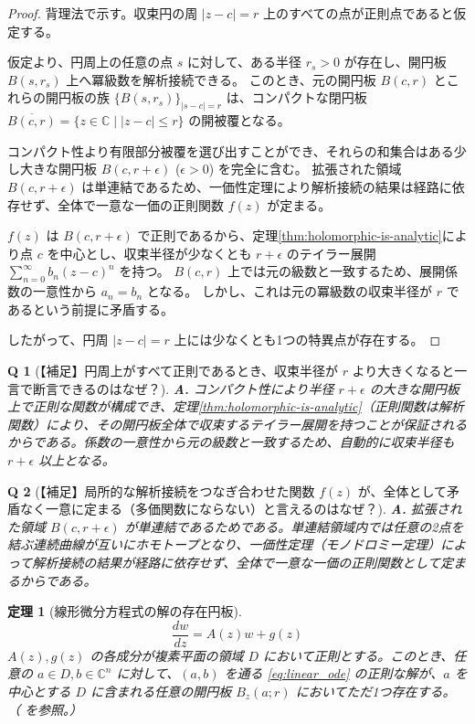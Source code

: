 \documentclass[paper=a4, fontsize=11pt]{jlreq} %
\theoremstyle{break}
\newtheorem{theorem}{定理}[section]
\theoremstyle{qa}
\newtheorem*{Q}{Q}
\theoremstyle{remark} %
\begin{document}
\begin{proof}
    背理法で示す。収束円の周 $|z-c|=r$ 上のすべての点が正則点であると仮定する。

    仮定より、円周上の任意の点 $s$ に対して、ある半径 $r_s > 0$ が存在し、開円板 $B(s, r_s)$ 上へ冪級数を解析接続できる。
    このとき、元の開円板 $B(c, r)$ とこれらの開円板の族 $\{B(s, r_s)\}_{|s-c|=r}$ は、コンパクトな閉円板 $\overline{B(c, r)} = \{z \in \mathbb{C} \mid |z-c| \le r\}$ の開被覆となる。

    コンパクト性より有限部分被覆を選び出すことができ、それらの和集合はある少し大きな開円板 $B(c, r+\epsilon)$ ($\epsilon > 0$) を完全に含む。
    拡張された領域 $B(c, r+\epsilon)$ は単連結であるため、一価性定理により解析接続の結果は経路に依存せず、全体で一意な一価の正則関数 $f(z)$ が定まる。

    $f(z)$ は $B(c, r+\epsilon)$ で正則であるから、定理\ref{thm:holomorphic-is-analytic}により点 $c$ を中心とし、収束半径が少なくとも $r+\epsilon$ のテイラー展開 $\sum_{n=0}^{\infty}b_{n}(z-c)^{n}$ を持つ。
    $B(c, r)$ 上では元の級数と一致するため、展開係数の一意性から $a_n = b_n$ となる。
    しかし、これは元の冪級数の収束半径が $r$ であるという前提に矛盾する。

    したがって、円周 $|z-c|=r$ 上には少なくとも1つの特異点が存在する。
\end{proof}

\begin{Q}[【補足】円周上がすべて正則であるとき、収束半径が $r$ より大きくなると一言で断言できるのはなぜ？]
\textbf{A.} コンパクト性により半径 $r+\epsilon$ の大きな開円板上で正則な関数が構成でき、定理\ref{thm:holomorphic-is-analytic}（正則関数は解析関数）により、その開円板全体で収束するテイラー展開を持つことが保証されるからである。係数の一意性から元の級数と一致するため、自動的に収束半径も $r+\epsilon$ 以上となる。
\end{Q}

\begin{Q}[【補足】局所的な解析接続をつなぎ合わせた関数 $f(z)$ が、全体として矛盾なく一意に定まる（多価関数にならない）と言えるのはなぜ？]
\textbf{A.} 拡張された領域 $B(c, r+\epsilon)$ が単連結であるためである。単連結領域内では任意の2点を結ぶ連続曲線が互いにホモトープとなり、一価性定理（モノドロミー定理）によって解析接続の結果が経路に依存せず、全体で一意な一価の正則関数として定まるからである。
\end{Q}
\begin{theorem}[線形微分方程式の解の存在円板]\label{thm:linear_existence}
    \begin{equation}\label{eq:linear_ode}
    \frac{dw}{dz}=A(z)w+g(z)
    \end{equation}
    $A(z), g(z)$ の各成分が複素平面の領域 $D$ において正則とする。このとき、任意の $a \in D, b \in \mathbb{C}^{n}$ に対して、$(a,b)$ を通る \eqref{eq:linear_ode} の正則な解が、$a$ を中心とする $D$ に含まれる任意の開円板 $B_{z}(a;r)$ においてただ1つ存在する。
   （\cite[p.56 定理8.6]{book:takano} を参照。）
\end{theorem}
\end{document}
